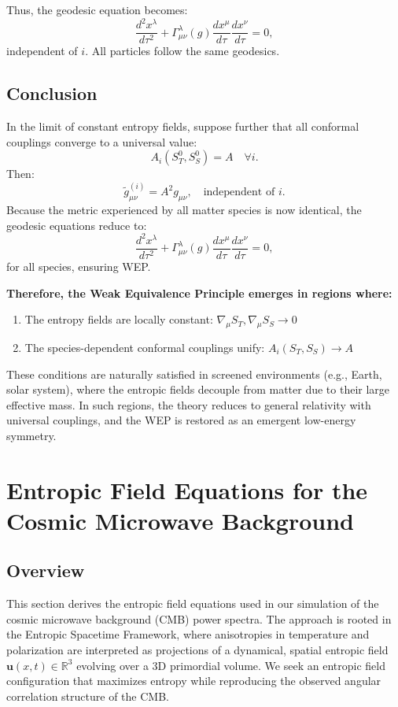 \documentclass[12pt, a4paper]{article}
\begin{document}
Thus, the geodesic equation becomes:
\[
\frac{d^2 x^\lambda}{d\tau^2} + \Gamma^{\lambda}_{\mu\nu}(g) \frac{dx^\mu}{d\tau} \frac{dx^\nu}{d\tau} = 0,
\]
independent of $i$. All particles follow the same geodesics.

\subsection{Conclusion}

In the limit of constant entropy fields, suppose further that all conformal couplings converge to a universal value:
\[
A_i(S_T^0, S_S^0) = A \quad \forall i.
\]
Then:
\[
\tilde{g}^{(i)}_{\mu\nu} = A^2 g_{\mu\nu}, \quad \text{independent of } i.
\]
Because the metric experienced by all matter species is now identical, the geodesic equations reduce to:
\[
\frac{d^2 x^\lambda}{d\tau^2} + \Gamma^\lambda_{\mu\nu}(g) \frac{dx^\mu}{d\tau} \frac{dx^\nu}{d\tau} = 0,
\]
for all species, ensuring WEP.

\textbf{Therefore, the Weak Equivalence Principle emerges in regions where:}
\begin{enumerate}
  \item The entropy fields are locally constant: \( \nabla_\mu S_T, \nabla_\mu S_S \to 0 \)
  \item The species-dependent conformal couplings unify: \( A_i(S_T, S_S) \to A \)
\end{enumerate}
These conditions are naturally satisfied in screened environments (e.g., Earth, solar system), where the entropic fields decouple from matter due to their large effective mass. In such regions, the theory reduces to general relativity with universal couplings, and the WEP is restored as an emergent low-energy symmetry.


\section{Entropic Field Equations for the Cosmic Microwave Background}

\subsection{Overview}

This section derives the entropic field equations used in our simulation of the cosmic microwave background (CMB) power spectra. The approach is rooted in the Entropic Spacetime Framework, where anisotropies in temperature and polarization are interpreted as projections of a dynamical, spatial entropic field \( \mathbf{u}(x, t) \in \mathbb{R}^3 \) evolving over a 3D primordial volume. We seek an entropic field configuration that maximizes entropy while reproducing the observed angular correlation structure of the CMB.
\end{document}
